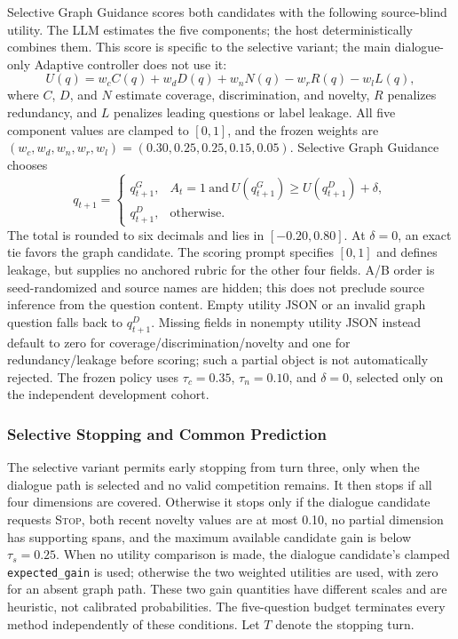 \documentclass{ieeeaccess}
\begin{document}
Selective Graph Guidance scores both candidates with the following source-blind utility.
The LLM estimates the five components; the host deterministically combines them.
This score is specific to the selective variant; the main dialogue-only
Adaptive controller does not use it:
\begin{equation}
U(q)=w_c C(q)+w_d D(q)+w_n N(q)-w_r R(q)-w_l L(q),
\label{eq:question_score}
\end{equation}
where $C$, $D$, and $N$ estimate coverage, discrimination, and novelty, $R$ penalizes
redundancy, and $L$ penalizes leading questions or label leakage. All five component values
are clamped to $[0,1]$, and the frozen weights are
$(w_c,w_d,w_n,w_r,w_l)=(0.30,0.25,0.25,0.15,0.05)$. Selective Graph Guidance chooses
\begin{equation}
q_{t+1}=\begin{cases}
q_{t+1}^G,& A_t=1\ \text{and}\ U(q_{t+1}^G)\ge U(q_{t+1}^D)+\delta,\\
q_{t+1}^D,& \text{otherwise}.
\end{cases}
\label{eq:selective_question}
\end{equation}
The total is rounded to six decimals and lies in $[-0.20,0.80]$. At $\delta=0$,
an exact tie favors the graph candidate. The scoring prompt specifies $[0,1]$ and defines
leakage, but supplies no anchored rubric for the other four fields. A/B order is
seed-randomized and source names are hidden; this does not preclude source inference
from the question content. Empty utility JSON or an invalid graph question falls back
to $q_{t+1}^D$. Missing fields in nonempty utility JSON instead default to zero for
coverage/discrimination/novelty and one for redundancy/leakage before scoring; such a
partial object is not automatically rejected. The frozen policy
uses $\tau_c=0.35$, $\tau_n=0.10$, and $\delta=0$, selected only on the independent
development cohort.

\subsubsection{Selective Stopping and Common Prediction}

The selective variant permits early stopping from turn three, only when the dialogue
path is selected and no valid competition remains. It then stops if all four dimensions
are covered. Otherwise it stops only if the dialogue candidate requests \textsc{Stop},
both recent novelty values are at most 0.10, no partial dimension has supporting spans,
and the maximum available candidate gain is below $\tau_s=0.25$. When no utility
comparison is made, the dialogue candidate's clamped \texttt{expected\_gain} is used;
otherwise the two weighted utilities are used, with zero for an absent graph path.
These two gain quantities have different scales and are heuristic, not calibrated
probabilities. The five-question budget terminates every method independently of
these conditions. Let $T$ denote the stopping turn.
\end{document}
